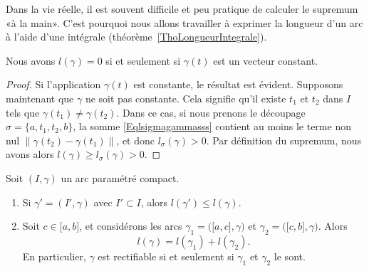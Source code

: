 Dans la vie réelle, il est souvent difficile et peu pratique de calculer le supremum «à la main». C'est pourquoi nous allons travailler à exprimer la longueur d'un arc à l'aide d'une intégrale (théorème~\ref{ThoLongueurIntegrale}).

\begin{lemma}
	Nous avons \( l(\gamma)=0\) si et seulement si \( \gamma(t)\) est un vecteur constant.
\end{lemma}

\begin{proof}
	Si l'application \( \gamma(t)\) est constante, le résultat est évident. Supposons maintenant que \( \gamma\) ne soit pas constante. Cela signifie qu'il existe \( t_1\) et \( t_2\) dans \( I\) tels que \( \gamma(t_1)\neq \gamma(t_2)\). Dans ce cas, si nous prenons le découpage \( \sigma=\{ a,t_1,t_2,b \}\), la somme \eqref{Eqlsigmagammasss} contient au moins le terme non nul \( \| \gamma(t_2)-\gamma(t_1) \|\), et donc \( l_{\sigma}(\gamma)>0\). Par définition du supremum, nous avons alors \( l(\gamma)\geq l_{\sigma}(\gamma)>0\).
\end{proof}

\begin{proposition}     \label{Propletautredecop}
	Soit \( (I,\gamma)\) un arc paramétré compact.
	\begin{enumerate}
		\item
		      Si \( \gamma'=(I',\gamma)\) avec \( I'\subset I\), alors \( l(\gamma')\leq l(\gamma)\).
		\item
		      Soit \( c\in\mathopen[ a , b \mathclose]\), et considérons les arcs \( \gamma_1=\big( \mathopen[ a , c \mathclose],\gamma \big)\) et \( \gamma_2=\big( \mathopen[ c , b \mathclose],\gamma \big)\). Alors
		      \begin{equation}
			      l(\gamma)=l(\gamma_1)+l(\gamma_2).
		      \end{equation}
		      En particulier, \( \gamma\) est rectifiable si et seulement si \( \gamma_1\) et \( \gamma_2\) le sont.
	\end{enumerate}
\end{proposition}

